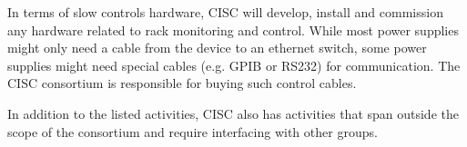 In terms of slow controls hardware, CISC will develop, install and
commission any hardware related to rack monitoring and control. While
most power supplies might only need a cable from the device to an
ethernet switch, some power supplies might need special cables (e.g.
GPIB or RS232) for communication. The CISC consortium is responsible for
buying such control cables.

In addition to the listed activities, CISC also has activities that span
outside the scope of the consortium and require interfacing with other
groups.

